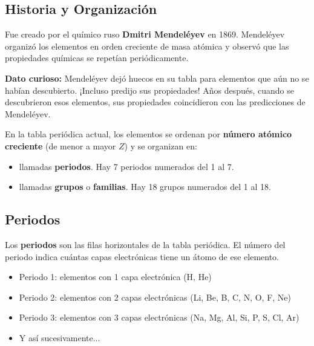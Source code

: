 \subsection{Historia y Organización}
Fue creado por el químico ruso \textbf{Dmitri Mendeléyev} en 1869. Mendeléyev organizó los elementos en orden creciente de masa atómica y observó que las propiedades químicas se repetían periódicamente.
\begin{remark}
    \textbf{Dato curioso:} Mendeléyev dejó huecos en su tabla para elementos que aún no se habían descubierto. ¡Incluso predijo sus propiedades! Años después, cuando se descubrieron esos elementos, sus propiedades coincidieron con las predicciones de Mendeléyev.
\end{remark}
En la tabla periódica actual, los elementos se ordenan por \textbf{número atómico creciente} (de menor a mayor \( Z \)) y se organizan en:
\begin{itemize}
    \item {} llamadas \textbf{periodos}. Hay 7 periodos numerados del 1 al 7.
    \item {} llamadas \textbf{grupos} o \textbf{familias}. Hay 18 grupos numerados del 1 al 18.
\end{itemize}

\subsection{Periodos}
Los \textbf{periodos} son las filas horizontales de la tabla periódica. El número del periodo indica cuántas capas electrónicas tiene un átomo de ese elemento.
\begin{itemize}
    \item Periodo 1: elementos con 1 capa electrónica (H, He)
    \item Periodo 2: elementos con 2 capas electrónicas (Li, Be, B, C, N, O, F, Ne)
    \item Periodo 3: elementos con 3 capas electrónicas (Na, Mg, Al, Si, P, S, Cl, Ar)
    \item Y así sucesivamente...
\end{itemize}

